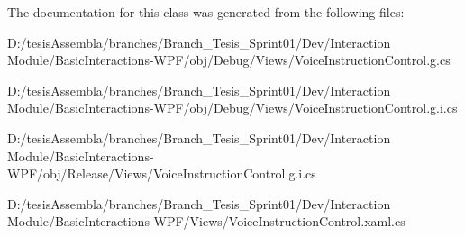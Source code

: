 The documentation for this class was generated from the following files\-:\begin{DoxyCompactItemize}
\item 
D\-:/tesis\-Assembla/branches/\-Branch\-\_\-\-Tesis\-\_\-\-Sprint01/\-Dev/\-Interaction Module/\-Basic\-Interactions-\/\-W\-P\-F/obj/\-Debug/\-Views/Voice\-Instruction\-Control.\-g.\-cs\item 
D\-:/tesis\-Assembla/branches/\-Branch\-\_\-\-Tesis\-\_\-\-Sprint01/\-Dev/\-Interaction Module/\-Basic\-Interactions-\/\-W\-P\-F/obj/\-Debug/\-Views/Voice\-Instruction\-Control.\-g.\-i.\-cs\item 
D\-:/tesis\-Assembla/branches/\-Branch\-\_\-\-Tesis\-\_\-\-Sprint01/\-Dev/\-Interaction Module/\-Basic\-Interactions-\/\-W\-P\-F/obj/\-Release/\-Views/Voice\-Instruction\-Control.\-g.\-i.\-cs\item 
D\-:/tesis\-Assembla/branches/\-Branch\-\_\-\-Tesis\-\_\-\-Sprint01/\-Dev/\-Interaction Module/\-Basic\-Interactions-\/\-W\-P\-F/\-Views/Voice\-Instruction\-Control.\-xaml.\-cs\end{DoxyCompactItemize}
